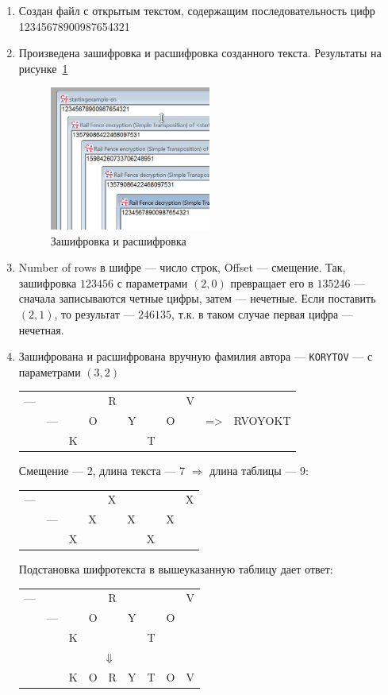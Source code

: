 \documentclass[a4paper, 14pt]{extarticle}
\begin{document}
\begin{enumerate}
    \item Создан файл с открытым текстом, содержащим последовательность цифр 12345678900987654321
    \item Произведена зашифровка и расшифровка созданного текста. Результаты на рисунке~\ref{img:fence:3}
    \begin{figure}[h]
        \centering
        \includegraphics[width=0.5\textwidth]{./img/S003.jpg}
        \caption{Зашифровка и расшифровка}%
        \label{img:fence:3}
    \end{figure}
    \item Number of rows в шифре --- число строк, Offset --- смещение. Так, зашифровка $123456$ с параметрами $(2,0)$ превращает его в $135246$ --- сначала записываются четные цифры, затем --- нечетные. Если поставить $(2,1)$, то результат --- $246135$, т.к. в таком случае первая цифра --- нечетная.
    \item Зашифрована и расшифрована вручную фамилия автора --- \texttt{KORYTOV} --- с параметрами $(3,2)$\\
    \begin{tabularx}{0.8\textwidth}{XXXXXXXXXXX}
    --- &   &  &  & R &  &  &  & V &  &  \\
      & --- &  & O &  & Y &  & O &  & =\textgreater{} & RVOYOKT \\
      &   & K &  &  &  & T &  &  &  & 
    \end{tabularx}

    Смещение --- 2, длина текста --- 7 $\Rightarrow$ длина таблицы --- 9:\\
    \begin{tabularx}{0.8\textwidth}{XXXXXXXXX}
    --- &  &  &  & X &  &  &  & X \\
     & --- &  & X &  & X &  & X &  \\
     &  & X &  &  &  & X &  & 
    \end{tabularx}

    Подстановка шифротекста в вышеуказанную таблицу дает ответ:\\
    \begin{tabularx}{0.8\textwidth}{XXXXXXXXX}
    --- &  &  &  & R &  &  &  & V \\
     & --- &  & O &  & Y &  & O &  \\
     &  & K &  &  &  & T &  &  \\
    \multicolumn{9}{c}{$ \Downarrow $} \\
     &  & K & O & R & Y & T & O & V
    \end{tabularx}


\end{enumerate}
\end{document}
